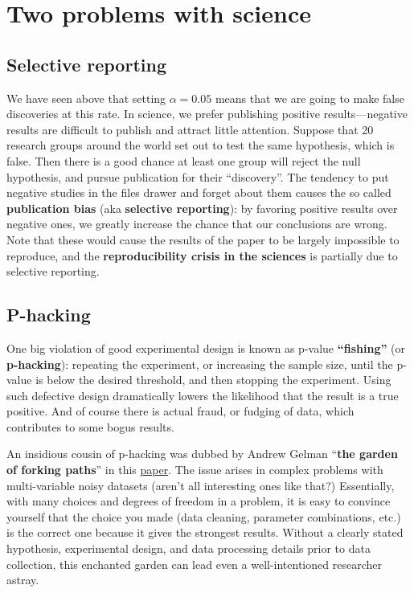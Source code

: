 \documentclass[
  letterpaper,
  DIV=11,
  numbers=noendperiod]{scrreprt}
\begin{document}
\section{Two problems with science}\label{two-problems-with-science}

\subsection{Selective reporting}\label{selective-reporting}

We have seen above that setting \(\alpha = 0.05\) means that we are
going to make false discoveries at this rate. In science, we prefer
publishing positive results---negative results are difficult to publish
and attract little attention. Suppose that 20 research groups around the
world set out to test the same hypothesis, which is false. Then there is
a good chance at least one group will reject the null hypothesis, and
pursue publication for their ``discovery''. The tendency to put negative
studies in the files drawer and forget about them causes the so called
\textbf{publication bias} (aka \textbf{selective reporting}): by
favoring positive results over negative ones, we greatly increase the
chance that our conclusions are wrong. Note that these would cause the
results of the paper to be largely impossible to reproduce, and the
\textbf{reproducibility crisis in the sciences} is partially due to
selective reporting.

\subsection{P-hacking}\label{p-hacking}

One big violation of good experimental design is known as p-value
\textbf{``fishing''} (or \textbf{p-hacking}): repeating the experiment,
or increasing the sample size, until the p-value is below the desired
threshold, and then stopping the experiment. Using such defective design
dramatically lowers the likelihood that the result is a true positive.
And of course there is actual fraud, or fudging of data, which
contributes to some bogus results.

An insidious cousin of p-hacking was dubbed by Andrew Gelman
``\textbf{the garden of forking paths}'' in this
\href{http://www.stat.columbia.edu/~gelman/research/unpublished/p_hacking.pdf}{paper}.
The issue arises in complex problems with multi-variable noisy datasets
(aren't all interesting ones like that?) Essentially, with many choices
and degrees of freedom in a problem, it is easy to convince yourself
that the choice you made (data cleaning, parameter combinations, etc.)
is the correct one because it gives the strongest results. Without a
clearly stated hypothesis, experimental design, and data processing
details prior to data collection, this enchanted garden can lead even a
well-intentioned researcher astray.
\end{document}
